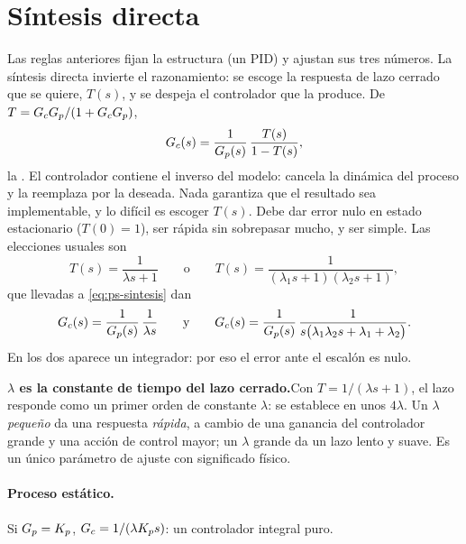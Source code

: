 \section{Síntesis directa}
\label{sec:ps-sintesis}

Las reglas anteriores fijan la estructura (un PID) y ajustan sus tres números. La síntesis directa invierte el razonamiento: se escoge la respuesta de lazo cerrado que se quiere, $T(s)$, y se despeja el controlador que la produce. De $T=G_cG_p/(1+G_cG_p)$,
\begin{equation}
  G_c(s)=\frac{1}{G_p(s)}\,\frac{T(s)}{1-T(s)} ,
  \label{eq:ps-sintesis}
\end{equation}
la . El controlador contiene el inverso del modelo: cancela la dinámica del proceso y la reemplaza por la deseada. Nada garantiza que el resultado sea implementable, y lo difícil es escoger $T(s)$. Debe dar error nulo en estado estacionario ($T(0)=1$), ser rápida sin sobrepasar mucho, y ser simple. Las elecciones usuales son
\begin{equation}
  T(s)=\frac{1}{\lambda s+1}
  \qquad\text{o}\qquad
  T(s)=\frac{1}{(\lambda_1 s+1)(\lambda_2 s+1)},
  \label{eq:ps-T-deseada}
\end{equation}
que llevadas a \eqref{eq:ps-sintesis} dan
\[
  G_c(s)=\frac{1}{G_p(s)}\,\frac{1}{\lambda s}
  \qquad\text{y}\qquad
  G_c(s)=\frac{1}{G_p(s)}\,\frac{1}{s\bigl(\lambda_1\lambda_2 s+\lambda_1+\lambda_2\bigr)} .
\]
En los dos aparece un integrador: por eso el error ante el escalón es nulo.

\begin{ideaclave}
\textbf{$\lambda$ es la constante de tiempo del lazo cerrado.}\enspace Con $T=1/(\lambda s+1)$, el lazo responde como un primer orden de constante $\lambda$: se establece en unos $4\lambda$. Un $\lambda$ \emph{pequeño} da una respuesta \emph{rápida}, a cambio de una ganancia del controlador grande y una acción de control mayor; un $\lambda$ grande da un lazo lento y suave. Es un único parámetro de ajuste con significado físico.
\end{ideaclave}

\paragraph{Proceso estático.} Si $G_p=K_p$, $G_c=1/(\lambda K_p s)$: un controlador integral puro.

